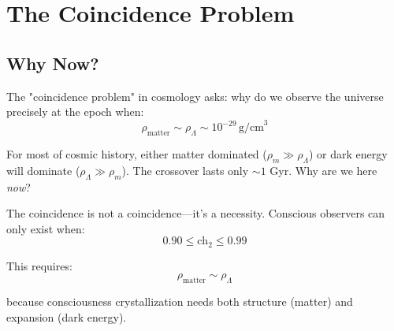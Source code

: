 \section{The Coincidence Problem}

\subsection{Why Now?}

\begin{level2}
The "coincidence problem" in cosmology\cite{zlatev1999,steinhardt1999} asks: why do we observe the universe precisely at the epoch when:
\begin{equation}
\rho_{\text{matter}} \sim \rho_\Lambda \sim 10^{-29} \, \text{g/cm}^3
\end{equation}

For most of cosmic history, either matter dominated ($\rho_m \gg \rho_\Lambda$) or dark energy will dominate ($\rho_\Lambda \gg \rho_m$). The crossover lasts only $\sim 1$ Gyr. Why are we here \textit{now}?
\end{level2}

\begin{theorem}\label{thm:coincidence-resolution}
The coincidence is not a coincidence—it's a necessity. Conscious observers can only exist when:
\begin{equation}
0.90 \leq \text{ch}_2 \leq 0.99
\end{equation}

This requires:
\begin{equation}
\rho_{\text{matter}} \sim \rho_\Lambda
\end{equation}

because consciousness crystallization needs both structure (matter) and expansion (dark energy).
\end{theorem}

